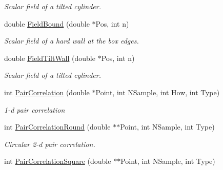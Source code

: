 \begin{DoxyCompactItemize}
\begin{DoxyCompactList}\small\item\em \-Scalar field of a tilted cylinder. \end{DoxyCompactList}\item 
\hypertarget{classVarData_a15167b970b637f6e42a37ac72baaea87}{double \hyperlink{classVarData_a15167b970b637f6e42a37ac72baaea87}{\-Field\-Bound} (double $\ast$\-Pos, int n)}\label{classVarData_a15167b970b637f6e42a37ac72baaea87}

\begin{DoxyCompactList}\small\item\em \-Scalar field of a hard wall at the box edges. \end{DoxyCompactList}\item 
\hypertarget{classVarData_ac0f4a9896eb935a803850787a5684858}{double \hyperlink{classVarData_ac0f4a9896eb935a803850787a5684858}{\-Field\-Tilt\-Wall} (double $\ast$\-Pos, int n)}\label{classVarData_ac0f4a9896eb935a803850787a5684858}

\begin{DoxyCompactList}\small\item\em \-Scalar field of a tilted cylinder. \end{DoxyCompactList}\item 
\hypertarget{classVarData_a510c054d13fe1a0f08ce51e357943a83}{int \hyperlink{classVarData_a510c054d13fe1a0f08ce51e357943a83}{\-Pair\-Correlation} (double $\ast$\-Point, int \-N\-Sample, int \-How, int \-Type)}\label{classVarData_a510c054d13fe1a0f08ce51e357943a83}

\begin{DoxyCompactList}\small\item\em 1-\/d pair correlation \end{DoxyCompactList}\item 
\hypertarget{classVarData_a8e19dbeb530f71fe335e0c0e4dc461c7}{int \hyperlink{classVarData_a8e19dbeb530f71fe335e0c0e4dc461c7}{\-Pair\-Correlation\-Round} (double $\ast$$\ast$\-Point, int \-N\-Sample, int \-Type)}\label{classVarData_a8e19dbeb530f71fe335e0c0e4dc461c7}

\begin{DoxyCompactList}\small\item\em \-Circular 2-\/d pair correlation. \end{DoxyCompactList}\item 
\hypertarget{classVarData_ac6d1ad4d99c748934659e3023246e766}{int \hyperlink{classVarData_ac6d1ad4d99c748934659e3023246e766}{\-Pair\-Correlation\-Square} (double $\ast$$\ast$\-Point, int \-N\-Sample, int \-Type)}\label{classVarData_ac6d1ad4d99c748934659e3023246e766}


\end{DoxyCompactItemize}
